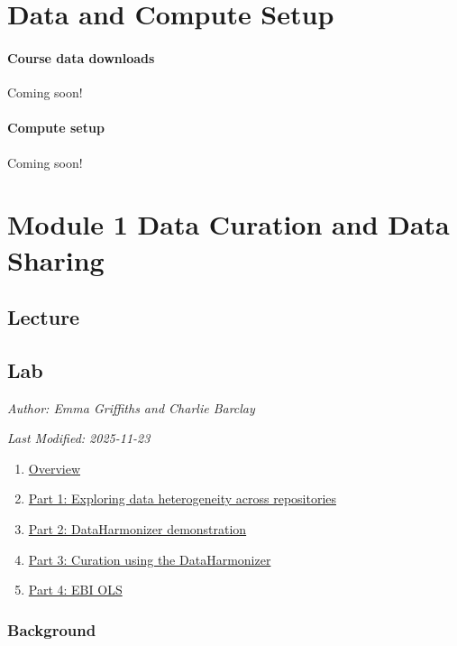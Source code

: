 \documentclass[
]{book}
\providecommand{\tightlist}{%
  \setlength{\itemsep}{0pt}\setlength{\parskip}{0pt}}
\begin{document}
\chapter{Data and Compute Setup}\label{data-and-compute-setup}

\subsubsection{Course data downloads}\label{course-data-downloads}

Coming soon!

\subsubsection{Compute setup}\label{compute-setup}

Coming soon!

\chapter{Module 1 Data Curation and Data Sharing}\label{module-1-data-curation-and-data-sharing}

\section{Lecture}\label{lecture}

\section{Lab}\label{lab}

\emph{Author: Emma Griffiths and Charlie Barclay}

\emph{Last Modified: 2025-11-23}

\begin{enumerate}
\def\labelenumi{\arabic{enumi}.}
\tightlist
\item
  \hyperref[intro2]{Overview}
\item
  \hyperref[exercise1]{Part 1: Exploring data heterogeneity across repositories}
\item
  \hyperref[exercise2]{Part 2: DataHarmonizer demonstration}
\item
  \hyperref[exercise3]{Part 3: Curation using the DataHarmonizer}
\item
  \hyperref[exercise4]{Part 4: EBI OLS}
\end{enumerate}

\subsection{Background}\label{intro2}
\end{document}
